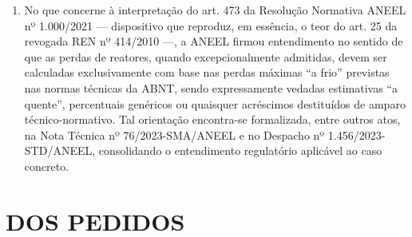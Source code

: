 \begin{enumerate}[resume]
\item
No que concerne à interpretação do art. 473 da Resolução Normativa ANEEL nº 1.000/2021 — dispositivo que reproduz, em essência, o teor do art. 25 da revogada REN nº 414/2010 —, a ANEEL firmou entendimento no sentido de que as perdas de reatores, quando excepcionalmente admitidas, devem ser calculadas exclusivamente com base nas perdas máximas “a frio” previstas nas normas técnicas da ABNT, sendo expressamente vedadas estimativas “a quente”, percentuais genéricos ou quaisquer acréscimos destituídos de amparo técnico-normativo. Tal orientação encontra-se formalizada, entre outros atos, na Nota Técnica nº 76/2023-SMA/ANEEL e no Despacho nº 1.456/2023-STD/ANEEL, consolidando o entendimento regulatório aplicável ao caso concreto.
\end{enumerate}

\section{DOS PEDIDOS}

